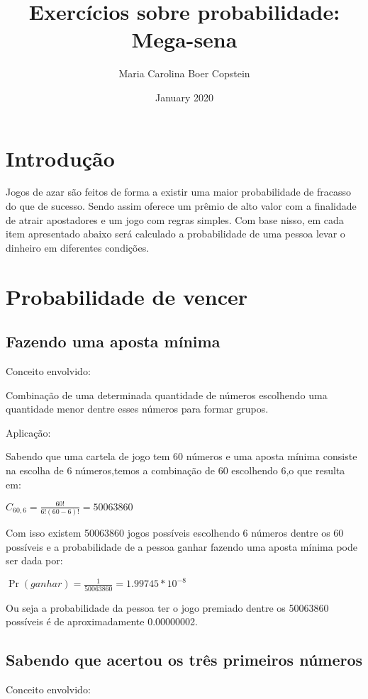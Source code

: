\documentclass{article}
\title{Exercícios sobre probabilidade: Mega-sena}
\author{Maria Carolina Boer Copstein}
\date{January 2020}
\begin{document}
\maketitle
\section{Introdução}
\hfill
 Jogos de azar são feitos de forma a existir uma maior probabilidade de fracasso do que de sucesso. Sendo assim oferece um prêmio de alto valor com a finalidade de atrair apostadores e um jogo com regras simples. Com base nisso, em cada item apresentado abaixo será calculado a probabilidade de uma pessoa levar o dinheiro em diferentes condições. 

\section{Probabilidade de vencer}
\subsection{Fazendo uma aposta mínima}
Conceito envolvido:
\hfill

Combinação de uma determinada quantidade de números escolhendo uma quantidade menor dentre esses números para formar grupos.

\hfill

Aplicação:
\hfill 

Sabendo que uma cartela de jogo tem 60 números e uma aposta mínima consiste na escolha de 6 números,temos a combinação de 60 escolhendo 6,o que resulta em:

\begin{center}
    $C_{60,6}=\frac{60!}{6!(60-6)!}=50063860$
\end{center}

\hfill 
Com isso existem 50063860 jogos possíveis escolhendo 6 números dentre os 60 possíveis e a probabilidade de a pessoa ganhar fazendo uma aposta mínima pode ser dada por:

\begin{center}
    $\Pr(ganhar)=\frac{1}{50063860}=1.99745*10^{-8}$
\end{center}

Ou seja a probabilidade da pessoa ter o jogo premiado dentre os 50063860 possíveis é de aproximadamente  0.00000002.


\subsection{Sabendo que acertou os três primeiros números}
Conceito envolvido:
\hfill 
\end{document}

